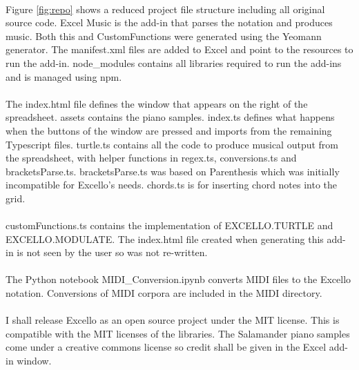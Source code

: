\paragraph{} Figure \ref{fig:repo} shows a reduced project file structure including all original source code. Excel Music is the add-in that parses the notation and produces music. Both this and CustomFunctions were generated using the Yeomann generator. The manifest.xml files are added to Excel and point to the resources to run the add-in. node\_modules contains all libraries required to run the add-ins and is managed using npm.

\paragraph{} The index.html file defines the window that appears on the right of the spreadsheet. assets contains the piano samples. index.ts defines what happens when the buttons of the window are pressed and imports from the remaining Typescript files. turtle.ts contains all the code to produce musical output from the spreadsheet, with helper functions in regex.ts, conversions.ts and bracketsParse.ts. bracketsParse.ts was based on Parenthesis which was initially incompatible for Excello's needs. chords.ts is for inserting chord notes into the grid.

\paragraph{} customFunctions.ts contains the implementation of EXCELLO.TURTLE and EXCELLO.MODULATE. The index.html file created when generating this add-in is not seen by the user so was not re-written.

\paragraph{} The Python notebook MIDI\_Conversion.ipynb converts MIDI files to the Excello notation. Conversions of MIDI corpora are included in the MIDI directory.

\paragraph{} I shall release Excello as an open source project under the MIT license. This is compatible with the MIT licenses of the libraries. The Salamander piano samples come under a creative commons license so credit shall be given in the Excel add-in window.
